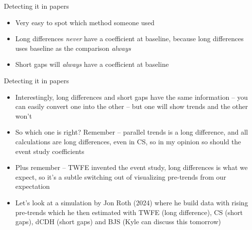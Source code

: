 \documentclass{beamer}
\begin{document}
\begin{frame}{Detecting it in papers}

\begin{itemize}

\item Very easy to spot which method someone used 
\item Long differences \emph{never} have a coefficient at baseline, because long differences uses baseline as the comparison \emph{always}
\item Short gaps will \emph{always} have a coefficient at baseline

\end{itemize}

\end{frame}

\begin{frame}{Detecting it in papers}

\begin{itemize}

\item Interestingly, long differences and short gaps have the same information -- you can easily convert one into the other -- but one will show trends and the other won't
\item So which one is right?  Remember -- parallel trends is a long difference, and all calculations are long differences, even in CS, so in my opinion so should the event study coefficients
\item Plus remember -- TWFE invented the event study, long differences is what we expect, so it's a subtle switching out of visualizing pre-trends from our expectation
\item Let's look at a simulation by Jon Roth (2024) where he build data with rising pre-trends which he then estimated with TWFE (long difference), CS (short gaps), dCDH (short gaps) and BJS (Kyle can discuss this tomorrow)

\end{itemize}

\end{frame}
\end{document}
